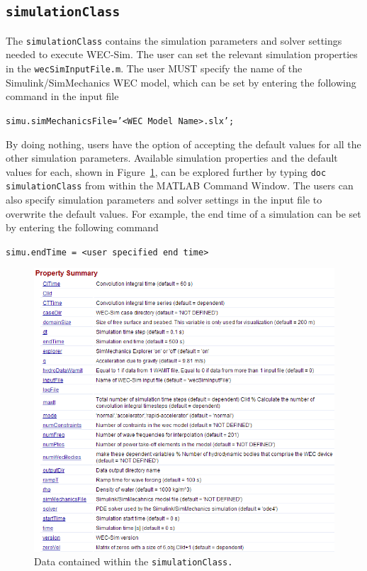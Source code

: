 \subsection{\texttt{simulationClass}}\label{subsec:simulationClass}
The \texttt{simulationClass} contains the simulation parameters and solver settings needed to execute WEC-Sim. The user can set the relevant simulation properties in the \texttt{wecSimInputFile.m}. The user MUST specify the name of the Simulink/SimMechanics WEC model, which can be set by entering the following command in the input file

\begin{center}\texttt{\qquad{}simu.simMechanicsFile='<WEC Model Name>.slx';}\end{center}

By doing nothing, users have the option of accepting the default values for all the other simulation parameters. Available simulation properties and the default values for each, shown in Figure~\ref{fig:simulationClass}, can be explored further by typing \texttt{doc simulationClass} from within the MATLAB Command Window. The users can also specify simulation parameters and solver settings  in the input file to overwrite the default values. For example, the end time of a simulation can be set by entering the following command

\begin{center}\texttt{simu.endTime = <user specified end time>}\end{center}

\begin{figure}[H]
\centering
\includegraphics[width=1\textwidth]{codeStruct/images/simulationClass}
\caption{Data contained within the \texttt{simulationClass.}}
\label{fig:simulationClass}
\end{figure}

